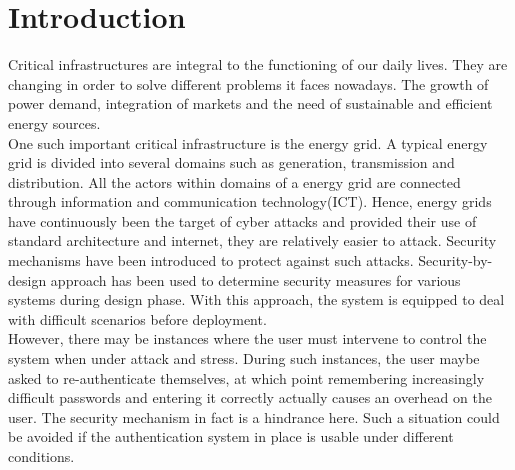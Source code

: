 \section{Introduction}

Critical infrastructures are integral to the functioning of our daily lives. They are changing in order to solve different problems it faces nowadays. The growth of power demand, integration of markets and the need of sustainable and efficient energy sources. \\
One such important critical infrastructure is the energy grid. A typical energy grid is divided into several domains such as generation, transmission and distribution. All the actors within domains of a energy grid are connected through information and communication technology(ICT). Hence, energy grids have continuously been the target of cyber attacks and provided their use of standard architecture and internet, they are relatively easier to attack. Security mechanisms have been introduced to protect against such attacks. Security-by-design approach has been used to determine security measures for various systems during design phase. With this approach, the system is equipped to deal with difficult scenarios before deployment. \\ However, there may be instances where the user must intervene to control the system when under attack and stress. During such instances, the user maybe asked to re-authenticate themselves, at which point remembering increasingly difficult passwords and entering it correctly actually causes an overhead on the user. The security mechanism in fact is a hindrance here. Such a situation could be avoided if the authentication system in place is usable under different conditions.

